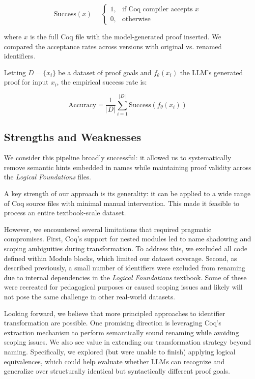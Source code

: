 \[
\text{Success}(x) =
\begin{cases}
1, & \text{if Coq compiler accepts } x \\
0, & \text{otherwise}
\end{cases}
\]

where \( x \) is the full Coq file with the model-generated proof inserted. We compared the acceptance rates across versions with original vs. renamed identifiers.

Letting \( D = \{x_i\} \) be a dataset of proof goals and \( f_\theta(x_i) \) the LLM's generated proof for input \( x_i \), the empirical success rate is:

\[
\text{Accuracy} = \frac{1}{|D|} \sum_{i=1}^{|D|} \text{Success}(f_\theta(x_i))
\]

\subsection{Strengths and Weaknesses}
We consider this pipeline broadly successful: it allowed us to systematically remove semantic hints embedded in names while maintaining proof validity across the \textit{Logical Foundations} files.

A key strength of our approach is its generality: it can be applied to a wide range of Coq source files with minimal manual intervention. This made it feasible to process an entire textbook-scale dataset.

However, we encountered several limitations that required pragmatic compromises.
First, Coq's support for nested modules led to name shadowing and scoping ambiguities during transformation.
To address this, we excluded all code defined within Module blocks, which limited our dataset coverage.
Second, as described previously, a small number of identifiers were excluded from renaming due to internal dependencies in the \textit{Logical Foundations} textbook. Some of these were recreated for pedagogical purposes or caused scoping issues and likely will not pose the same challenge in other real-world datasets.

Looking forward, we believe that more principled approaches to identifier transformation are possible. One promising direction is leveraging Coq's extraction mechanism to perform semantically sound renaming while avoiding scoping issues.
We also see value in extending our transformation strategy beyond naming.
Specifically, we explored (but were unable to finish) applying logical equivalences, which could help evaluate whether LLMs can recognize and generalize over structurally identical but syntactically different proof goals.
